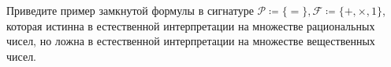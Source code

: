 Приведите пример замкнутой формулы в сигнатуре $\mathcal{P} \coloneqq \{=\}, \mathcal{F} \coloneqq \{+,
\times, 1\}$, которая истинна в естественной интерпретации на множестве рациональных чисел, но ложна в
естественной интерпретации на множестве вещественных чисел.